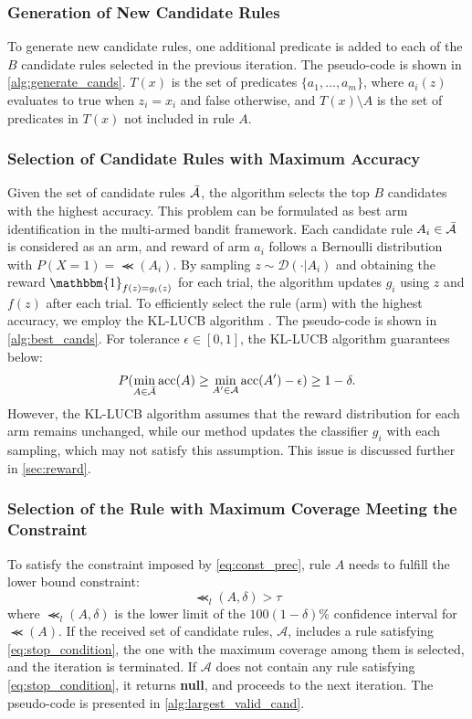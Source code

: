 \documentclass[11pt]{article}
\begin{document}
\subsubsection{Generation of New Candidate Rules}
To generate new candidate rules,
one additional predicate is added to each of the $B$ candidate rules
selected in the previous iteration.
The pseudo-code is shown in \cref{alg:generate_cands}.
$T(x)$ is the set of predicates $\{a_1,\dots,a_m\}$,
where $a_i(z)$ evaluates to true when $z_i=x_i$ and false otherwise,
and $T(x)\setminus A$ is the set of predicates in $T(x)$ not included in rule $A$.

\subsubsection{Selection of Candidate Rules with Maximum Accuracy}
Given the set of candidate rules $\bar{\mathcal{A}}$,
the algorithm selects the top $B$ candidates with the highest accuracy.
This problem can be formulated
as best arm identification in the multi-armed bandit framework.
Each candidate rule $A_i\in\bar{\mathcal{A}}$ is considered as an arm,
and reward of arm $a_i$ follows a Bernoulli distribution
with $P(X=1)=\Prec(A_i)$.
By sampling $z\sim\mathcal{D}(\cdot|A_i)$
and obtaining the reward $\mathbbm{1}_{f(z)=g_i(z)}$ for each trial,
the algorithm updates $g_i$ using $z$ and $f(z)$ after each trial.
To efficiently select the rule (arm) with the highest accuracy,
we employ the KL-LUCB algorithm \cite{kaufmann2013information}.
The pseudo-code is shown in \cref{alg:best_cands}.
For tolerance $\epsilon\in[0,1]$, the KL-LUCB algorithm guarantees below:
\begin{equation}
  P(\underset{A\in\bar{\mathcal{A}}}{\min}\operatorname{acc}(A)\ge
  \underset{A'\in\mathcal{A}}{\min}\operatorname{acc}(A')-\epsilon)\ge1-\delta.
\end{equation}
However,
the KL-LUCB algorithm assumes that the reward distribution for each arm
remains unchanged,
while our method updates the classifier $g_i$ with each sampling,
which may not satisfy this assumption.
This issue is discussed further in \cref{sec:reward}.

\subsubsection{Selection of the Rule with Maximum Coverage Meeting the Constraint}
To satisfy the constraint imposed by \cref{eq:const_prec}, rule $A$ needs to fulfill the lower bound constraint:
\begin{equation}
  \Prec_{l}(A,\delta)>\tau
  \label{eq:stop_condition}
\end{equation}
where $\Prec_{l}(A,\delta)$ is the lower limit of
the $100(1-\delta)$\% confidence interval for $\Prec(A)$.
If the received set of candidate rules, $\mathcal{A}$,
includes a rule satisfying \cref{eq:stop_condition},
the one with the maximum coverage among them is selected,
and the iteration is terminated.
If $\mathcal{A}$ does not contain any rule satisfying \cref{eq:stop_condition},
it returns \textbf{null},
and proceeds to the next iteration.
The pseudo-code is presented in \cref{alg:largest_valid_cand}.
\end{document}
